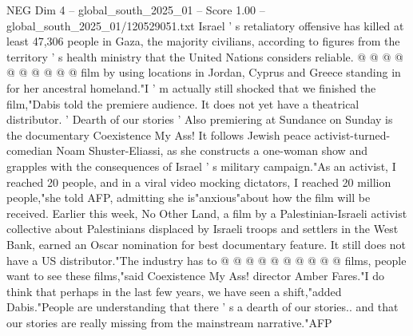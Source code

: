 \begin{textsample}{NEG Dim 4 – global\_south\_2025\_01 – Score 1.00 – global\_south\_2025\_01/120529051.txt}
Israel ' s retaliatory offensive has killed at least 47,306 people in Gaza, the majority civilians, according to figures from the territory ' s health ministry that the United Nations considers reliable. @ @ @ @ @ @ @ @ @ @ film by using locations in Jordan, Cyprus and Greece standing in for her ancestral homeland."I ' m actually still shocked that we finished the film,"Dabis told the premiere audience.
It does not yet have a theatrical distributor. ' Dearth of our stories ' Also premiering at Sundance on Sunday is the documentary Coexistence My Ass!
It follows Jewish peace activist-turned-comedian Noam Shuster-Eliassi, as she constructs a one-woman show and grapples with the consequences of Israel ' s military campaign."As an activist, I reached 20 people, and in a viral video mocking dictators, I reached 20 million people,"she told AFP, admitting she is"anxious"about how the film will be received.
Earlier this week, No Other Land, a film by a Palestinian-Israeli activist collective about Palestinians displaced by Israeli troops and settlers in the West Bank, earned an Oscar nomination for best documentary feature.
It still does not have a US distributor."The industry has to @ @ @ @ @ @ @ @ @ @ films, people want to see these films,"said Coexistence My Ass! director Amber Fares."I do think that perhaps in the last few years, we have seen a shift,"added Dabis."People are understanding that there ' s a dearth of our stories.. and that our stories are really missing from the mainstream narrative."AFP

\end{textsample}
